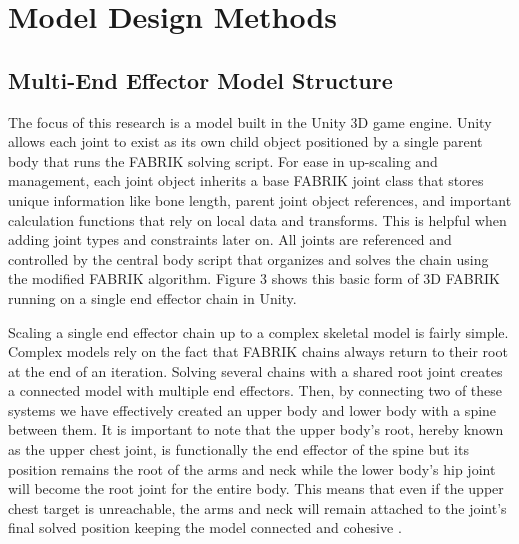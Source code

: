 \documentclass[10pt,twocolumn]{article}
\begin{document}
\section{Model Design Methods}

\subsection{Multi-End Effector Model Structure}


 The focus of this research is a model built in the Unity 3D game engine. Unity allows each joint to exist as its own child object positioned by a single parent body that runs the FABRIK solving script. For ease in up-scaling and management, each joint object inherits a base FABRIK joint class that stores unique information like bone length, parent joint object references, and important calculation functions that rely on local data and transforms. This is helpful when adding joint types and constraints later on. All joints are referenced and controlled by the central body script that organizes and solves the chain using the modified FABRIK algorithm. Figure 3 shows this basic form of 3D FABRIK running on a single end effector chain in Unity. 

Scaling a single end effector chain up to a complex skeletal model is fairly simple. Complex models rely on the fact that FABRIK chains always return to their root at the end of an iteration. Solving several chains with a shared root joint creates a connected model with multiple end effectors. Then, by connecting two of these systems we have effectively created an upper body and lower body with a spine between them. It is important to note that the upper body’s root, hereby known as the upper chest joint, is functionally the end effector of the spine but its position remains the root of the arms and neck while the lower body’s hip joint will become the root joint for the entire body. This means that even if the upper chest target is unreachable, the arms and neck will remain attached to the joint’s final solved position keeping the model connected and cohesive \cite{baseFABRIK}\cite{FABRIKoptimized}\cite{animalsIK}. 
\end{document}
